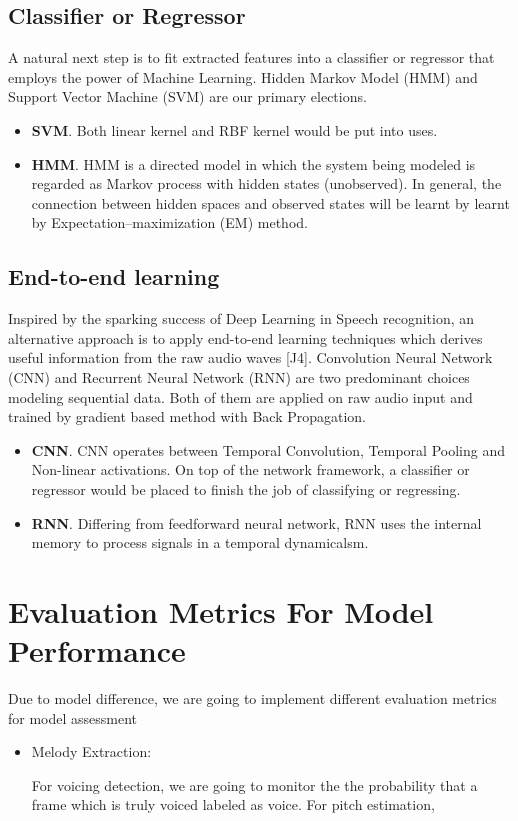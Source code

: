 \documentclass[12pt]{article}
\begin{document}
\subsection{Classifier or Regressor}
A natural next step is to fit extracted features into a classifier or regressor that employs the power of Machine Learning. Hidden Markov Model (HMM) and Support Vector Machine (SVM) are our primary elections.
\begin{itemize}
\item \textbf{SVM}. Both linear kernel and RBF kernel would be put into uses.
\item \textbf{HMM}. HMM is a directed model in which the system being modeled is regarded as Markov process with hidden states (unobserved). 
In general, the connection between hidden spaces and observed states will be learnt by learnt by Expectation–maximization (EM) method.
\end{itemize}

\subsection{End-to-end learning}
Inspired by the sparking success of Deep Learning in Speech recognition, an alternative approach is to apply end-to-end learning techniques which derives useful information from the raw audio waves [J4]. 
Convolution Neural Network (CNN) and Recurrent Neural Network (RNN) are two predominant choices modeling sequential data. Both of them are applied on raw audio input and trained by gradient based method with Back Propagation.
\begin{itemize}
\item \textbf{CNN}. CNN operates between Temporal Convolution, Temporal Pooling and Non-linear activations. On top of the network framework, a classifier or regressor would be placed to finish the job of classifying or regressing.
\item \textbf{RNN}. Differing from feedforward neural network, RNN uses the internal memory to process signals in a temporal dynamicalsm.
\end{itemize}


\section{Evaluation Metrics For Model Performance}
Due to model difference, we are going to implement different evaluation metrics for model assessment

\begin{itemize}
\item Melody Extraction: 

For voicing detection, we are going to monitor the the probability that a frame which is truly voiced labeled as voice. For pitch estimation, 
\end{itemize}
  
\end{document}
